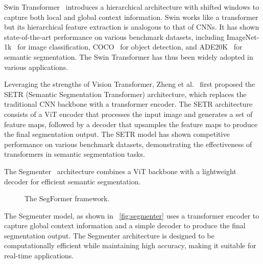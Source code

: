 Swin Transformer~\cite{transformer_swin} introduces a hierarchical architecture with shifted windows to capture both local and global context information. Swin works like a transformer but its hierarchical feature extraction is analogous to that of CNNs. It has shown state-of-the-art performance on various benchmark datasets, including ImageNet-1k~\cite{dataset_imagenet} for image classification, COCO~\cite{dataset_coco} for object detection, and ADE20K~\cite{dataset_ade20k} for semantic segmentation. The Swin Transformer has thus been widely adopted in various applications.

Leveraging the strengths of Vision Transformer, Zheng et al.~\cite{fsss_setr} first proposed the SETR (Semantic Segmentation Transformer) architecture, which replaces the traditional CNN backbone with a transformer encoder. The SETR architecture consists of a ViT encoder that processes the input image and generates a set of feature maps, followed by a decoder that upsamples the feature maps to produce the final segmentation output. The SETR model has shown competitive performance on various benchmark datasets, demonstrating the effectiveness of transformers in semantic segmentation tasks.

The Segmenter~\cite{fsss_segmenter} architecture combines a ViT backbone with a lightweight decoder for efficient semantic segmentation. 
\begin{figure}[htbp]
    \centering
    \caption{The SegFormer framework.}
    \label{fig:segmenter}
\end{figure}

The Segmenter model, as shown in ~\autoref{fig:segmenter} uses a transformer encoder to capture global context information and a simple decoder to produce the final segmentation output. The Segmenter architecture is designed to be computationally efficient while maintaining high accuracy, making it suitable for real-time applications.

